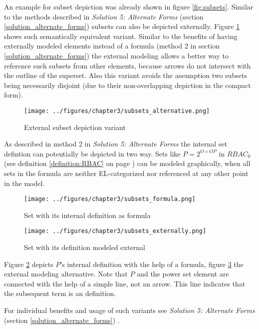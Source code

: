 \documentclass[twoside, openright, 12pt]{book}
\begin{document}
An example for subset depiction was already shown in figure \ref{fig:subsets}.
Similar to the methods described in \textit{Solution 5: Alternate Forms} (section \ref{solution_alternate_forms}) subsets can also be depicted externally.
Figure \ref{fig:subsets_alternative} shows such semantically equivalent variant.
Similar to the benefits of having externally modeled elements instead of a formula (method 2 in section \ref{solution_alternate_forms}) the external modeling allows a better way to reference such subsets from other elements, because arrows do not intersect with the outline of the superset.
Also this variant avoids the assumption two subsets being necessarily disjoint (due to their non-overlapping depiction in the compact form).

\begin{figure}[htb]
	\centering
	\texttt{[image: ../figures/chapter3/subsets\_alternative.png]}
	\caption{External subset depiction variant}
	\label{fig:subsets_alternative}
\end{figure}

\noindent
As described in method 2 in \textit{Solution 5: Alternate Forms} the internal set defintion can potentially be depicted in two way.
Sets like $P = 2^{O \times OP}$ in $RBAC_0$ (see definition \ref{definition:RBAC} on page \pageref{definition:RBAC}) can be modeled graphically, when all sets in the formula are neither EL-categorized nor referenced at any other point in the model.

\begin{figure}[htb]
	\centering
	\texttt{[image: ../figures/chapter3/subsets\_formula.png]}
	\caption{Set with its internal definition as formula}
	\label{fig:subsets_formula}
\end{figure}

\begin{figure}[htb]
	\centering
	\texttt{[image: ../figures/chapter3/subsets\_externally.png]}
	\caption{Set with its definition modeled external}
	\label{fig:subsets_externally}
\end{figure}

\noindent
Figure \ref{fig:subsets_formula} depicts $P$'s internal definition with the help of a formula, figure \ref{fig:subsets_externally} the external modeling alternative.
Note that $P$ and the power set element are connected with the help of a simple line, not an arrow.
This line indicates that the subsequent term is an definition.

For individual benefits and usage of such variants see \textit{Solution 5: Alternate Forms} (section \ref{solution_alternate_forms}) .
\end{document}

